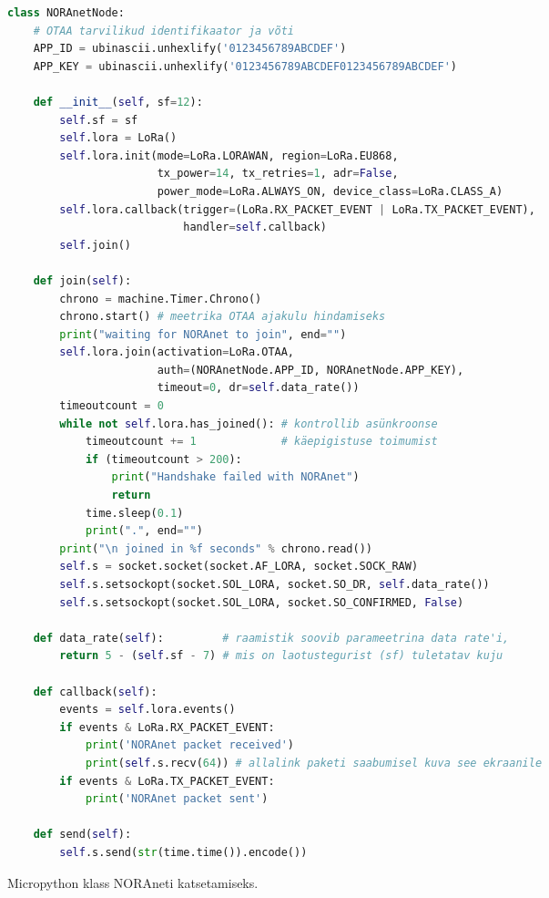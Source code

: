 \documentclass[12pt]{article}
\begin{document}
    \begin{figure}[h]
        \begin{spacing}{0.8}
            \begin{lstlisting}[language=Python]
class NORAnetNode:
    # OTAA tarvilikud identifikaator ja võti
    APP_ID = ubinascii.unhexlify('0123456789ABCDEF')
    APP_KEY = ubinascii.unhexlify('0123456789ABCDEF0123456789ABCDEF')

    def __init__(self, sf=12):
        self.sf = sf
        self.lora = LoRa()
        self.lora.init(mode=LoRa.LORAWAN, region=LoRa.EU868,
                       tx_power=14, tx_retries=1, adr=False,
                       power_mode=LoRa.ALWAYS_ON, device_class=LoRa.CLASS_A)
        self.lora.callback(trigger=(LoRa.RX_PACKET_EVENT | LoRa.TX_PACKET_EVENT),
                           handler=self.callback)
        self.join()

    def join(self):
        chrono = machine.Timer.Chrono()
        chrono.start() # meetrika OTAA ajakulu hindamiseks
        print("waiting for NORAnet to join", end="")
        self.lora.join(activation=LoRa.OTAA,
                       auth=(NORAnetNode.APP_ID, NORAnetNode.APP_KEY),
                       timeout=0, dr=self.data_rate())
        timeoutcount = 0
        while not self.lora.has_joined(): # kontrollib asünkroonse
            timeoutcount += 1             # käepigistuse toimumist
            if (timeoutcount > 200):
                print("Handshake failed with NORAnet")
                return
            time.sleep(0.1)
            print(".", end="")
        print("\n joined in %f seconds" % chrono.read())
        self.s = socket.socket(socket.AF_LORA, socket.SOCK_RAW)
        self.s.setsockopt(socket.SOL_LORA, socket.SO_DR, self.data_rate())
        self.s.setsockopt(socket.SOL_LORA, socket.SO_CONFIRMED, False)

    def data_rate(self):         # raamistik soovib parameetrina data rate'i,
        return 5 - (self.sf - 7) # mis on laotustegurist (sf) tuletatav kuju

    def callback(self):
        events = self.lora.events()
        if events & LoRa.RX_PACKET_EVENT:
            print('NORAnet packet received')
            print(self.s.recv(64)) # allalink paketi saabumisel kuva see ekraanile
        if events & LoRa.TX_PACKET_EVENT:
            print('NORAnet packet sent')

    def send(self):
        self.s.send(str(time.time()).encode())
            \end{lstlisting}
        \end{spacing}
        \caption{Micropython klass NORAneti katsetamiseks.}
        \label{fig:codenoranet}
    \end{figure}
\end{document}
